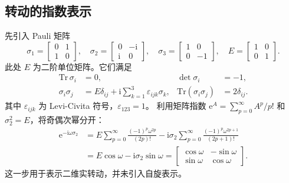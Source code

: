 \subsection{转动的指数表示}
先引入 Pauli 矩阵
\begin{equation}
\sigma_1=\begin{bmatrix}0&1\\1&0\end{bmatrix},\quad
\sigma_2=\begin{bmatrix}0&-\mathrm{i}\\\mathrm{i}&0\end{bmatrix},\quad
\sigma_3=\begin{bmatrix}1&0\\0&-1\end{bmatrix},\quad
E=\begin{bmatrix}1&0\\0&1\end{bmatrix}.
\end{equation}
此处 $E$ 为二阶单位矩阵。它们满足
\begin{align}
\mathrm{Tr}\,\sigma_i&=0,&\det\sigma_i&=-1,\\
\sigma_i\sigma_j&=E\delta_{ij}+\mathrm{i}\sum_{k=1}^3\varepsilon_{ijk}\sigma_k,&
\mathrm{Tr}\left(\sigma_i\sigma_j\right)&=2\delta_{ij}.
\end{align}
其中 $\varepsilon_{ijk}$ 为 Levi-Civita 符号，$\varepsilon_{123}=1$。
利用矩阵指数 $\mathrm{e}^A=\sum_{p=0}^\infty A^p/p!$ 和 $\sigma_2^2=E$，将奇偶次幂分开：
\begin{align}
\mathrm{e}^{-\mathrm{i}\omega\sigma_2}
&=E\sum_{p=0}^{\infty}\frac{\left(-1\right)^p\omega^{2p}}{\left(2p\right)!}
-\mathrm{i}\sigma_2\sum_{p=0}^{\infty}\frac{\left(-1\right)^p\omega^{2p+1}}{\left(2p+1\right)!}\\
&=E\cos\omega-\mathrm{i}\sigma_2\sin\omega
=\begin{bmatrix}\cos\omega&-\sin\omega\\\sin\omega&\cos\omega\end{bmatrix}.
\end{align}
这一步用于表示二维实转动，并未引入自旋表示。

